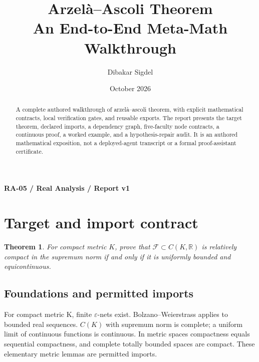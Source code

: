 \documentclass[preprint,12pt,aps,pra,showkeys,amsmath,amssymb,superscriptaddress,floatfix]{revtex4-2}
\newtheorem{theorem}{Theorem}[section]
\theoremstyle{definition}
\theoremstyle{remark}
\begin{document}
\title{Arzelà--Ascoli Theorem\\[4pt]\large An End-to-End Meta-Math Walkthrough}

\author{Dibakar Sigdel}


\date{October 2026}

\begin{abstract}

A complete authored walkthrough of arzelà--ascoli theorem, with explicit
mathematical contracts, local verification gates, and reusable exports.
The report presents the target theorem, declared imports, a dependency
graph, five-faculty node contracts, a continuous proof, a worked
example, and a hypothesis-repair audit. It is an authored mathematical
exposition, not a deployed-agent transcript or a formal proof-assistant
certificate.

\end{abstract}\maketitle\linespread{1.12}\selectfont

\noindent\textbf{RA-05 / Real Analysis / Report v1}

\section{Target and import contract}

\begin{theorem}

For compact metric \(K\), prove that
\(\mathcal F\subset C(K,\mathbb R)\) is relatively compact in the
supremum norm if and only if it is uniformly bounded and equicontinuous.

\end{theorem}

\subsection{Foundations and permitted imports}

For compact metric K, finite \(\varepsilon\)-nets exist.
Bolzano--Weierstrass applies to bounded real sequences. \(C(K)\) with
supremum norm is complete; a uniform limit of continuous functions is
continuous. In metric spaces compactness equals sequential compactness,
and complete totally bounded spaces are compact. These elementary metric
lemmas are permitted imports.
\end{document}

